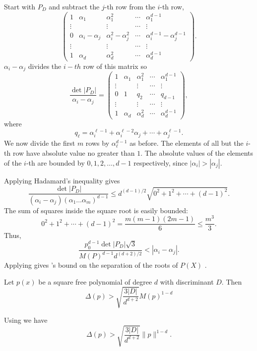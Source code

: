 Start with $P_D$ and subtract the $j$-th row from the $i$-th row,
\[
\left(\begin{array}{ccccccc}
1 & \alpha_1 & \alpha_1^2 & \cdots & \alpha_1^{d-1} \\
\vdots & & \vdots & \cdots & \vdots \\
0 & \alpha_i - \alpha_j & \alpha_i^2 - \alpha_j^2 & \cdots &
\alpha_i^{d-1} - \alpha_j^{d-1} \\
\vdots & & \vdots & \cdots & \vdots \\
1 & \alpha_d & \alpha_d^2 & \cdots & \alpha_d^{d-1} 
\end{array}\right).
\]
$\alpha_i - \alpha_j$ divides the $i-th$ row of this matrix so
\[
\frac{\det|P_D|}{\alpha_i - \alpha_j} = 
\left(\begin{array}{ccccccc}
1 & \alpha_1 & \alpha_1^2 & \cdots & \alpha_1^{d-1} \\
\vdots & & \vdots & \cdots & \vdots \\
0 & 1 & q_2 & \cdots & q_{d-1} \\
\vdots & & \vdots & \cdots & \vdots \\
1 & \alpha_d & \alpha_d^2 & \cdots & \alpha_d^{d-1} 
\end{array}\right),
\]
where 
\[
q_{\ell} = \alpha_i^{\ell-1} + \alpha_i^{\ell -2} \alpha_j + \cdots +
\alpha_j^{\ell-1}.
\]
We now divide the first $m$ rows by $\alpha_{\ell}^{d-1}$ as before.
The elements of all but the $i$-th row have absolute value no
greater than $1$.  The absolute values of the elements of the $i$-th
are bounded by $0, 1, 2, \ldots, {d-1}$ respectively, since
$|\alpha_i| > |\alpha_j|$.  

Applying Hadamard's inequality gives
\[
\frac{\det|P_D|}{(\alpha_i - \alpha_j) (\alpha_1 \ldots
\alpha_m)^{d-1}} 
\le d^{(d-1)/2}\sqrt{0^2 + 1^2 + \cdots + (d-1)^2}.
\]
The sum of squares inside the square root is easily bounded:
\[
0^2 + 1^2 + \cdots + (d-1)^2 = \frac{m(m-1)(2m-1)}{6} \le
\frac{m^3}{3}.
\]
Thus,
\[
\frac{p_0^{d-1} \det|P_D| \sqrt{3}}{M(P)^{d-1} d^{(d+2)/2}} 
   < |\alpha_i - \alpha_j|.
\]
Applying  gives {\Mahler}'s bound on the separation 
of the roots of $P(X)$ \cite{Mahler1964-vy}.

\begin{proposition}[{\Mahler}]
Let $p(x)$ be a square free polynomial of degree $d$ with discriminant $D$.
Then
\[
\Delta(p) > \sqrt{\frac{3 |D|}{d^{d+2}}} M(p)^{1-d}
\]
\end{proposition}

Using  we have
\[
\Delta(p) > \sqrt{\frac{3 |D|}{d^{d+2}}} \|p\|^{1-d}.
\]

